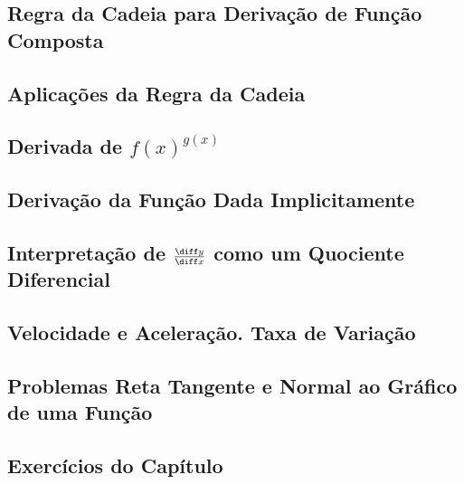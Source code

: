 \subsection{Regra da Cadeia para Derivação de Função Composta}
\subsection{Aplicações da Regra da Cadeia}
\subsection{Derivada de $f(x)^{g(x)}$}
\subsection{Derivação da Função Dada Implicitamente}
\subsection{Interpretação de $\frac{\diff y}{\diff x}$ como um Quociente Diferencial}
\subsection{Velocidade e Aceleração. Taxa de Variação}
\subsection{Problemas Reta Tangente e Normal ao Gráfico de uma Função}
\subsection{Exercícios do Capítulo}
